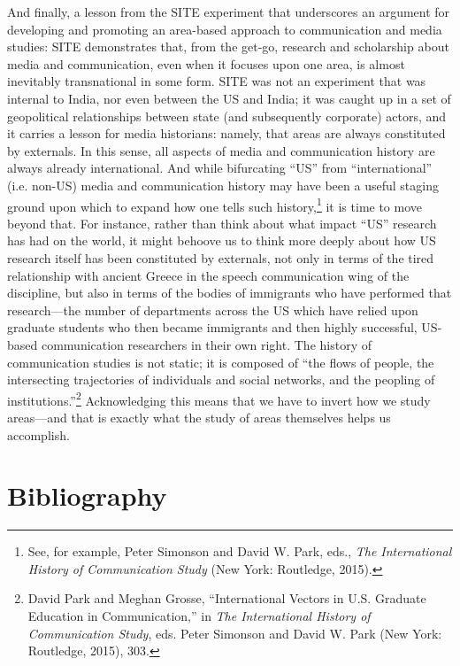\documentclass{tufte-handout}
\begin{document}
And finally, a lesson from the SITE experiment that underscores an
argument for developing and promoting an area-based approach to
communication and media studies: SITE demonstrates that, from the
get-go, research and scholarship about media and communication, even
when it focuses upon one area, is almost inevitably transnational in
some form. SITE was not an experiment that was internal to India, nor
even between the US and India; it was caught up in a set of geopolitical
relationships between state (and subsequently corporate) actors, and it
carries a lesson for media historians: namely, that areas are always
constituted by externals. In this sense, all aspects of media and
communication history are always already international. And while
bifurcating ``US'' from ``international'' (i.e. non-US) media and
communication history may have been a useful staging ground upon which
to expand how one tells such history,\footnote{See, for example, Peter
  Simonson and David W. Park, eds., \emph{The International History of
  Communication Study} (New York: Routledge, 2015).} it is time to move
beyond that. For instance, rather than think about what impact ``US''
research has had on the world, it might behoove us to think more deeply
about how US research itself has been constituted by externals, not only
in terms of the tired relationship with ancient Greece in the speech
communication wing of the discipline, but also in terms of the bodies of
immigrants who have performed that research---the number of departments
across the US which have relied upon graduate students who then became
immigrants and then highly successful, US-based communication
researchers in their own right. The history of communication studies is
not static; it is composed of ``the flows of people, the intersecting
trajectories of individuals and social networks, and the peopling of
institutions.''\footnote{David Park and Meghan Grosse, ``International
  Vectors in U.S. Graduate Education in Communication,'' in \emph{The
  International History of Communication Study}, eds. Peter Simonson and
  David W. Park (New York: Routledge, 2015), 303.} Acknowledging this
means that we have to invert how we study areas---and that is exactly
what the study of areas themselves helps us accomplish.







\section{Bibliography}\label{bibliography}
\end{document}

